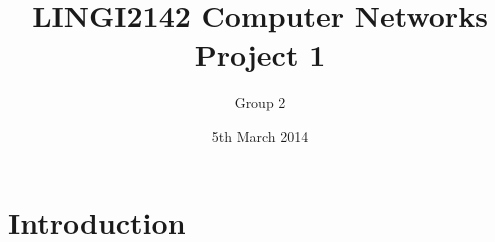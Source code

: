\documentclass[handout,usenames,dvipsnames]{beamer}
\title[LINGI2142 Project 1]{LINGI2142 Computer Networks \\ Project 1} %
\author[Group 2] {Group 2} %
\institute[UCL] %
{
Université Catholique de Louvain \\ %
\medskip

}
\date{5th March 2014} %
\begin{document}
\begin{frame}
\titlepage %
\end{frame}

\section{Introduction}
\begin{frame}

\end{frame}

%
%
%
%
\end{document}
